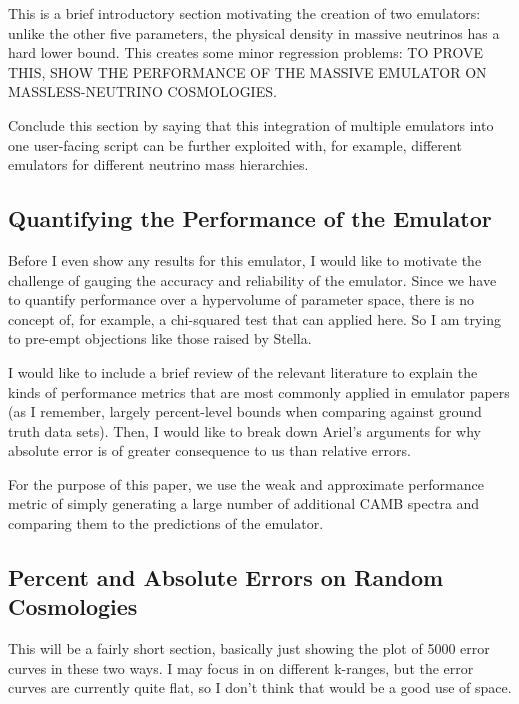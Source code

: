 \documentclass[11pt]{article}
\begin{document}
This is a brief introductory section motivating the creation of two emulators: unlike the other five parameters, the physical density in massive neutrinos has a hard lower bound. This creates some minor regression problems: TO PROVE THIS, SHOW THE PERFORMANCE OF THE MASSIVE EMULATOR ON MASSLESS-NEUTRINO COSMOLOGIES.

Conclude this section by saying that this integration of multiple emulators into one user-facing script can be further exploited with, for example, different emulators for different neutrino mass hierarchies.

\begin{centering}
\subsection{Quantifying the Performance of the Emulator}
\end{centering}

Before I even show any results for this emulator, I would like to motivate the challenge of gauging the accuracy and reliability of the emulator. Since we have to quantify performance over a hypervolume of parameter space, there is no concept of, for example, a chi-squared test that can applied here. So I am trying to pre-empt objections like those raised by Stella.

I would like to include a brief review of the relevant literature to explain the kinds of performance metrics that are most commonly applied in emulator papers (as I remember, largely percent-level bounds when comparing against ground truth data sets). Then, I would like to break down Ariel's arguments for why absolute error is of greater consequence to us than relative errors.

For the purpose of this paper, we use the weak and approximate performance metric of simply generating a large number of additional CAMB spectra and comparing them to the predictions of the emulator.

\begin{centering}
\subsection{Percent and Absolute Errors on Random Cosmologies}
\end{centering}

This will be a fairly short section, basically just showing the plot of 5000 error curves in these two ways. I may focus in on different k-ranges, but the error curves are currently quite flat, so I don't think that would be a good use of space.
\end{document}
